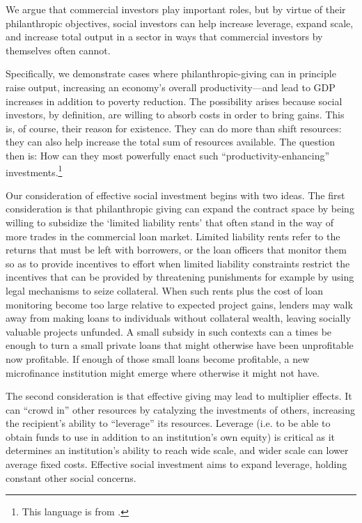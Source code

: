 \documentclass[letterpaper, 12pt]{article}
\begin{document}
We argue that commercial investors play important roles, but by virtue of their philanthropic objectives, social investors can help increase
leverage, expand scale, and increase total output in a sector in ways that commercial investors by themselves often cannot.

Specifically, we demonstrate cases where philanthropic-giving can in principle raise output, increasing an economy's overall
productivity---and lead to GDP increases in addition to poverty reduction. The possibility arises because social investors, by
definition, are willing to absorb costs in order to bring gains. This is, of course, their reason for existence. They can do more than shift
resources: they can also help increase the total sum of resources available. The question then is: How can they most powerfully enact such
``productivity-enhancing'' investments.\footnote{This language is from \citet{bardhan2000}.}

Our consideration of effective social investment begins with two ideas.
The first consideration is that philanthropic giving can expand the
contract space by being willing to subsidize the `limited liability
rents' that often stand in the way of more trades in the commercial loan
market. Limited liability rents refer to the returns that must be left
with borrowers, or the loan officers that monitor them so as to provide
incentives to effort when limited liability constraints restrict the
incentives that can be provided by threatening punishments for example
by using legal mechanisms to seize collateral. When such rents plus the
cost of loan monitoring become too large relative to expected project
gains, lenders may walk away from making loans to individuals without
collateral wealth, leaving socially valuable projects unfunded. A small
subsidy in such contexts can a times be enough to turn a small private
loans that might otherwise have been unprofitable now profitable. If
enough of those small loans become profitable, a new microfinance
institution might emerge where otherwise it might not have.

The second consideration is that effective giving may lead to multiplier
effects. It can ``crowd in'' other resources by catalyzing the
investments of others, increasing the recipient's ability to
``leverage'' its resources. Leverage (i.e. to be able to obtain funds to
use in addition to an institution's own equity) is critical as it
determines an institution's ability to reach wide scale, and wider scale
can lower average fixed costs. Effective social investment aims to
expand leverage, holding constant other social concerns.
\end{document}
